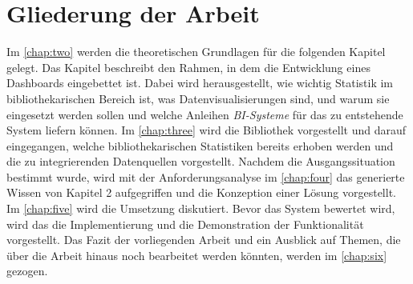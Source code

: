 \section{Gliederung der Arbeit}
Im \autoref{chap:two} werden die theoretischen Grundlagen für die folgenden Kapitel gelegt. 
Das Kapitel beschreibt den Rahmen, in dem die Entwicklung eines Dashboards eingebettet ist. Dabei wird herausgestellt, wie wichtig Statistik
im bibliothekarischen Bereich ist, was Datenvisualisierungen sind, und warum sie eingesetzt werden sollen und welche Anleihen \textit{\acrshort{BI}-Systeme} 
für das zu entstehende System liefern können. Im \autoref{chap:three}
wird die Bibliothek vorgestellt und darauf eingegangen, welche bibliothekarischen Statistiken bereits erhoben werden und die zu integrierenden Datenquellen vorgestellt.
Nachdem die Ausgangssituation bestimmt wurde, wird mit der Anforderungsanalyse  im \autoref{chap:four} das generierte Wissen von Kapitel 2
aufgegriffen und die Konzeption einer Lösung vorgestellt.
Im \autoref{chap:five} wird die Umsetzung diskutiert. Bevor das System bewertet wird, wird das die Implementierung und die Demonstration der Funktionalität vorgestellt.
Das Fazit der vorliegenden Arbeit und ein Ausblick auf Themen, die über die Arbeit hinaus noch bearbeitet werden könnten, werden im \autoref{chap:six} gezogen.

